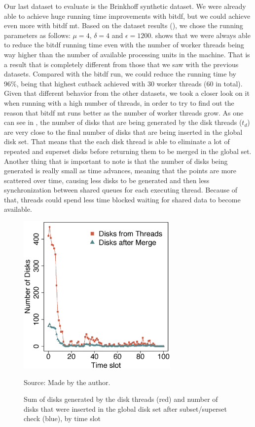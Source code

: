 {Our last dataset to evaluate is the Brinkhoff synthetic dataset. We were already able to achieve huge running time
improvements with \ac{bitdf}, but we could achieve even more with \ac{bitdf} \ac{mt}. Based on the dataset results
(), we chose the running parameters as follows: $\mu=4$, $\delta=4$ and $\epsilon=1200$.
 shows that we were always able to reduce the \ac{bitdf} running time even with the number
of worker threads being way higher than the number of available processing units in the machine. That is a result that
is completely different from those that we saw with the previous datasets. Compared with the \ac{bitdf} run, we could
reduce the running time by 96\%, being that highest cutback achieved with 30 worker threads (60 in total). Given that
different behavior from the other datasets, we took a closer look on it when running with a high number of threads, in
order to try to find out the reason that \ac{bitdf} \ac{mt} runs better as the number of worker threads grow. As one can
see in , the number of disks that are being generated by the disk threads ($t_d$)
are very close to the final number of disks that are being inserted in the global disk set. That means that the each
disk thread is able to eliminate a lot of repeated and superset disks before returning them to be merged in the global
set. Another thing that is important to note is that the number of disks being generated is really small as time
advances, meaning that the points are more scattered over time, causing less disks to be generated and then less
synchronization between shared queues for each executing thread. Because of that, threads could spend less time blocked
waiting for shared data to become available.

\begin{figure}[h!]
    \centering
    \caption{Sum of disks generated by the disk threads (red) and number of disks that were inserted in the global disk
        set after subset/superset check (blue), by time slot}
    \centerline{\includegraphics[width=0.7\textwidth]{images/Brinkhoff_disks_threads.eps}}
    \footnotesize{Source: Made by the author.}
    \label{fig:brinkhoff_disks_threads}
\end{figure}

}
